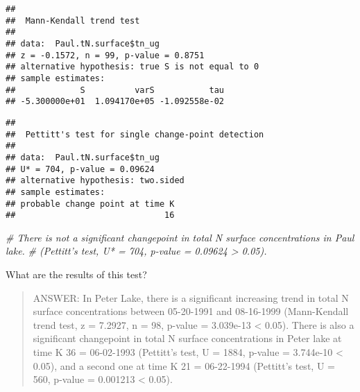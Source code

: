 \documentclass[]{article}
\newenvironment{Shaded}{\begin{snugshade}}{\end{snugshade}}
\newcommand{\KeywordTok}[1]{\textcolor[rgb]{0.13,0.29,0.53}{\textbf{#1}}}
\newcommand{\CommentTok}[1]{\textcolor[rgb]{0.56,0.35,0.01}{\textit{#1}}}
\newcommand{\OperatorTok}[1]{\textcolor[rgb]{0.81,0.36,0.00}{\textbf{#1}}}
\newcommand{\NormalTok}[1]{#1}
\begin{document}
\begin{verbatim}
## 
##  Mann-Kendall trend test
## 
## data:  Paul.tN.surface$tn_ug
## z = -0.1572, n = 99, p-value = 0.8751
## alternative hypothesis: true S is not equal to 0
## sample estimates:
##             S          varS           tau 
## -5.300000e+01  1.094170e+05 -1.092558e-02
\end{verbatim}

\begin{Shaded}
\end{Shaded}

\begin{verbatim}
## 
##  Pettitt's test for single change-point detection
## 
## data:  Paul.tN.surface$tn_ug
## U* = 704, p-value = 0.09624
## alternative hypothesis: two.sided
## sample estimates:
## probable change point at time K 
##                              16
\end{verbatim}

\begin{Shaded}
\begin{Highlighting}[]
\CommentTok{# There is not a significant changepoint in total N surface concentrations in Paul lake. }
\CommentTok{# (Pettitt's test, U* = 704, p-value = 0.09624 > 0.05).}
\end{Highlighting}
\end{Shaded}

What are the results of this test?

\begin{quote}
ANSWER: In Peter Lake, there is a significant increasing trend in total
N surface concentrations between 05-20-1991 and 08-16-1999 (Mann-Kendall
trend test, z = 7.2927, n = 98, p-value = 3.039e-13 \textless{} 0.05).
There is also a significant changepoint in total N surface
concentrations in Peter lake at time K 36 = 06-02-1993 (Pettitt's test,
U = 1884, p-value = 3.744e-10 \textless{} 0.05), and a second one at
time K 21 = 06-22-1994 (Pettitt's test, U = 560, p-value = 0.001213
\textless{} 0.05).
\end{quote}
\end{document}
